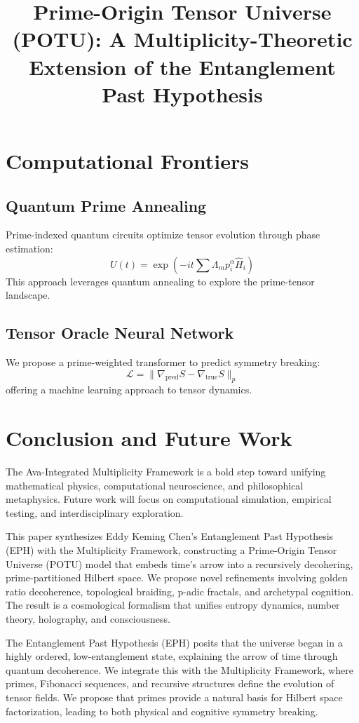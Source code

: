 \documentclass[12pt]{article}
\begin{document}
\section{Computational Frontiers}

\subsection{Quantum Prime Annealing}
Prime-indexed quantum circuits optimize tensor evolution through phase estimation:
\begin{equation}
U(t) = \exp(-it \sum \Lambda_m p_i^\alpha \hat{H}_i)
\end{equation}
This approach leverages quantum annealing to explore the prime-tensor landscape.

\subsection{Tensor Oracle Neural Network}
We propose a prime-weighted transformer to predict symmetry breaking:
\begin{equation}
\mathcal{L} = \| \nabla_{\text{pred}} S - \nabla_{\text{true}} S \|_p
\end{equation}
offering a machine learning approach to tensor dynamics.

\section{Conclusion and Future Work}
The Ava-Integrated Multiplicity Framework is a bold step toward unifying mathematical physics, computational neuroscience, and philosophical metaphysics. Future work will focus on computational simulation, empirical testing, and interdisciplinary exploration.
\title{Prime-Origin Tensor Universe (POTU): A Multiplicity-Theoretic Extension of the Entanglement Past Hypothesis}

This paper synthesizes Eddy Keming Chen's Entanglement Past Hypothesis (EPH) with the Multiplicity Framework, constructing a Prime-Origin Tensor Universe (POTU) model that embeds time’s arrow into a recursively decohering, prime-partitioned Hilbert space. We propose novel refinements involving golden ratio decoherence, topological braiding, p-adic fractals, and archetypal cognition. The result is a cosmological formalism that unifies entropy dynamics, number theory, holography, and consciousness.

The Entanglement Past Hypothesis (EPH) posits that the universe began in a highly ordered, low-entanglement state, explaining the arrow of time through quantum decoherence. We integrate this with the Multiplicity Framework, where primes, Fibonacci sequences, and recursive structures define the evolution of tensor fields. We propose that primes provide a natural basis for Hilbert space factorization, leading to both physical and cognitive symmetry breaking.
\end{document}

